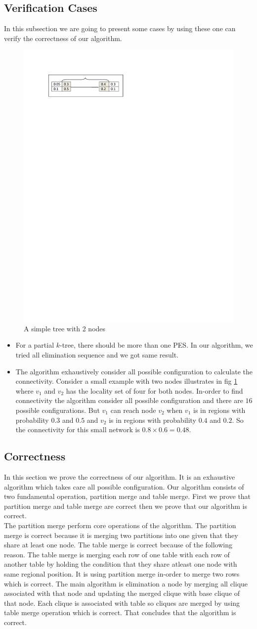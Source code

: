 \documentclass[11pt]{article}
\begin{document}
\subsection{Verification Cases}
\label{subsec:vc}
In this subsection we are going to present some cases by using these one can verify the correctness of our algorithm.
\begin{figure}
\label{fig:var}
\begin{minipage}{.9\linewidth}
\includegraphics[width=3 in, height=.6 in]{verification.pdf}
\caption{A simple tree with 2 nodes}
\end{minipage}
\end{figure}
\begin{itemize}
\item For a partial $k$-tree, there should be more than one PES. In our algorithm, we tried all elimination sequence and we got same result.
\item The algorithm exhaustively consider all possible configuration to calculate the connectivity. Consider a small example with two nodes illustrates in fig \ref{fig:var} where $v_1$ and $v_2$ has the locality set of four for both nodes. In-order to find connectivity the algorithm consider all possible configuration and there are $16$ possible configurations. But $v_1$ can reach node $v_2$ when $v_1$ is in regions with probability $0.3$ and $0.5$ and $v_2$ is in regions with probability $0.4$ and $0.2$. So the connectivity for this small network is $0.8 \times 0.6=0.48$.

\end{itemize}

\subsection{Correctness}
In this section we prove the correctness of our algorithm. It is an exhaustive algorithm which takes care all possible configuration.
Our algorithm consists of two fundamental operation, partition merge and table merge. First we prove that partition merge and table merge are correct then we prove that our algorithm is correct.\\
 The partition merge perform core operations of the algorithm. The partition merge is correct because it is merging two partitions into one given that they share at least one node. The table merge is correct because of the following reason. The table merge is merging each row of one table with each row of another table by holding the condition that they share atleast one node with same regional position. It is using partition merge in-order to merge two rows which is correct. The main algorithm is elimination a node by merging all clique associated with that node and updating the merged clique with base clique of that node. Each clique is associated with table so cliques are merged by using table merge operation which is correct. That concludes that the algorithm is correct.
\end{document}
